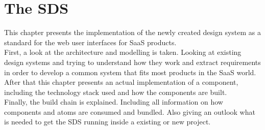\newpage
\section{The \acl{SDS}}
This chapter presents the implementation of the newly created design system as a standard for the web user interfaces for SaaS products. \\
First, a look at the architecture and modelling is taken. Looking at existing design systems and trying to understand  how they work and extract requirements in order to develop a common system that fits most products in the SaaS world. \\
After that this chapter presents an actual implementation of a component, including the technology stack used and how the components are built. \\
Finally, the build chain is explained. Including all information on how components and atoms are consumed and bundled. Also giving an outlook what is needed to get the \ac{SDS} running inside a existing or new project.


